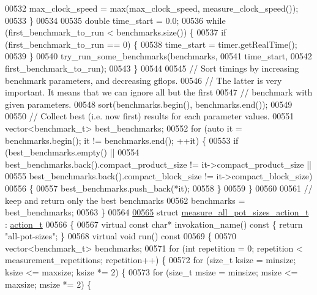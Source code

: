 \begin{DoxyCode}
{{{{{{{00532     max\_clock\_speed = max(max\_clock\_speed, measure\_clock\_speed());
00533   \}
00534   
00535   \textcolor{keywordtype}{double} time\_start = 0.0;
00536   \textcolor{keywordflow}{while} (first\_benchmark\_to\_run < benchmarks.size()) \{
00537     \textcolor{keywordflow}{if} (first\_benchmark\_to\_run == 0) \{
00538       time\_start = timer.getRealTime();
00539     \}
00540     try\_run\_some\_benchmarks(benchmarks,
00541                             time\_start,
00542                             first\_benchmark\_to\_run);
00543   \}
00544 
00545   \textcolor{comment}{// Sort timings by increasing benchmark parameters, and decreasing gflops.}
00546   \textcolor{comment}{// The latter is very important. It means that we can ignore all but the first}
00547   \textcolor{comment}{// benchmark with given parameters.}
00548   sort(benchmarks.begin(), benchmarks.end());
00549 
00550   \textcolor{comment}{// Collect best (i.e. now first) results for each parameter values.}
00551   vector<benchmark\_t> best\_benchmarks;
00552   \textcolor{keywordflow}{for} (\textcolor{keyword}{auto} it = benchmarks.begin(); it != benchmarks.end(); ++it) \{
00553     \textcolor{keywordflow}{if} (best\_benchmarks.empty() ||
00554         best\_benchmarks.back().compact\_product\_size != it->compact\_product\_size ||
00555         best\_benchmarks.back().compact\_block\_size != it->compact\_block\_size)
00556     \{
00557       best\_benchmarks.push\_back(*it);
00558     \}
00559   \}
00560 
00561   \textcolor{comment}{// keep and return only the best benchmarks}
00562   benchmarks = best\_benchmarks;
00563 \}
00564 
\hyperlink{structmeasure__all__pot__sizes__action__t}{00565} \textcolor{keyword}{struct }\hyperlink{structmeasure__all__pot__sizes__action__t}{measure\_all\_pot\_sizes\_action\_t} : \hyperlink{structaction__t}{action\_t}
00566 \{
00567   \textcolor{keyword}{virtual} \textcolor{keyword}{const} \textcolor{keywordtype}{char}* invokation\_name()\textcolor{keyword}{ const }\{ \textcolor{keywordflow}{return} \textcolor{stringliteral}{"all-pot-sizes"}; \}
00568   \textcolor{keyword}{virtual} \textcolor{keywordtype}{void} run()\textcolor{keyword}{ const}
00569 \textcolor{keyword}{  }\{
00570     vector<benchmark\_t> benchmarks;
00571     \textcolor{keywordflow}{for} (\textcolor{keywordtype}{int} repetition = 0; repetition < measurement\_repetitions; repetition++) \{
00572       \textcolor{keywordflow}{for} (\textcolor{keywordtype}{size\_t} ksize = minsize; ksize <= maxsize; ksize *= 2) \{
00573         \textcolor{keywordflow}{for} (\textcolor{keywordtype}{size\_t} msize = minsize; msize <= maxsize; msize *= 2) \{
}}}}}}}
\end{DoxyCode}
